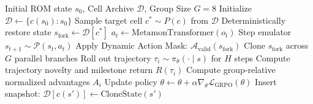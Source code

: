 \documentclass[journal,10pt,twocolumn]{IEEEtran}
\begin{document}
\begin{algorithm}[h]
\caption{Unified Neuro-Symbolic JRPG Master Progression Loop}
\label{alg:unified_agent}
\begin{algorithmic}[1]
\REQUIRE Initial ROM state $s_0$, Cell Archive $\mathcal{D}$, Group Size $G=8$
\STATE Initialize $\mathcal{D} \leftarrow \{c(s_0): s_0\}$
    \STATE Sample target cell $c^* \sim P(c)$ from $\mathcal{D}$
    \STATE Deterministically restore state $s_{\text{fork}} \leftarrow \mathcal{D}[c^*]$
        \STATE $a_t \leftarrow \text{MetamonTransformer}(o_t)$
        \STATE Step emulator $s_{t+1} \sim \mathcal{P}(s_t, a_t)$
    \ELSE
        \STATE Apply Dynamic Action Mask: $\mathcal{A}_{\text{valid}}(s_{\text{fork}})$
        \STATE Clone $s_{\text{fork}}$ across $G$ parallel branches
            \STATE Roll out trajectory $\tau_i \sim \pi_\theta(\cdot \mid s)$ for $H$ steps
            \STATE Compute trajectory novelty and milestone return $R(\tau_i)$
        \ENDFOR
        \STATE Compute group-relative normalized advantages $A_i$
        \STATE Update policy $\theta \leftarrow \theta + \alpha \nabla_\theta \mathcal{L}_{\text{GRPO}}(\theta)$
                \STATE Insert snapshot: $\mathcal{D}[c(s')] \leftarrow \text{CloneState}(s')$
            \ENDIF
        \ENDFOR
    \ENDIF
\ENDWHILE
\end{algorithmic}
\end{algorithm}
\end{document}
